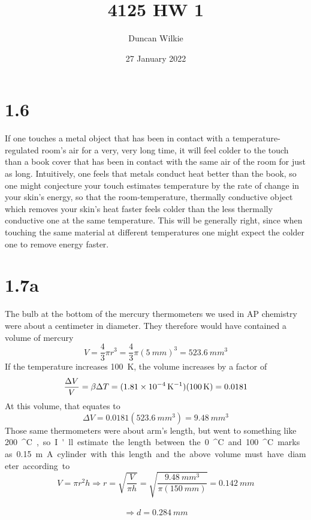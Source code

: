 \documentclass{article}
\title{4125 HW 1}
\author{Duncan Wilkie}
\date{27 January 2022}
\begin{document}
\maketitle

\section*{1.6}
If one touches a metal object that has been in contact with a temperature-regulated room's air for a very, very long time, it will feel colder to the touch than a book cover that has been in contact with the same air of the room for just as long. Intuitively, one feels that metals conduct heat better than the book, so one might conjecture your touch estimates temperature by the rate of change in your skin's energy, so that the room-temperature, thermally conductive object which removes your skin's heat faster feels colder than the less thermally conductive one at the same temperature. This will be generally right, since when touching the same material at different temperatures one might expect the colder one to remove energy faster.

\section*{1.7a}
The bulb at the bottom of the mercury thermometers we used in AP chemistry were about a centimeter in diameter. They therefore would have contained a volume of mercury
\[V=\frac{4}{3}\pi r^3=\frac{4}{3}\pi(\SI{5}{mm})^3=\SI{523.6}{mm^3}\]
If the temperature increases \SI{100}{K}, the volume increases by a factor of
\[\frac{\Delta V}{V}=\beta\Delta T=(\SI{1.81E-4}{K^{-1}})(\SI{100}{K})=0.0181\]
At this volume, that equates to
\[\Delta V=0.0181(\SI{523.6}{mm^3})=\SI{9.48}{mm^3}\]
Those same thermometers were about arm's length, but went to something like \SI{200}{^\circ C}, so I'll estimate the length between the \SI{0}{^\circ C} and \SI{100}{^\circ C} marks as \SI{0.15}{m}. A cylinder with this length and the above volume must have diameter according to
\[V=\pi r^2h\Rightarrow r=\sqrt{\frac{V}{\pi h}}=\sqrt{\frac{\SI{9.48}{mm^3}}{\pi(\SI{150}{mm})}}=\SI{0.142}{mm}\]
\[\Rightarrow d=\SI{0.284}{mm}\]
\end{document}
